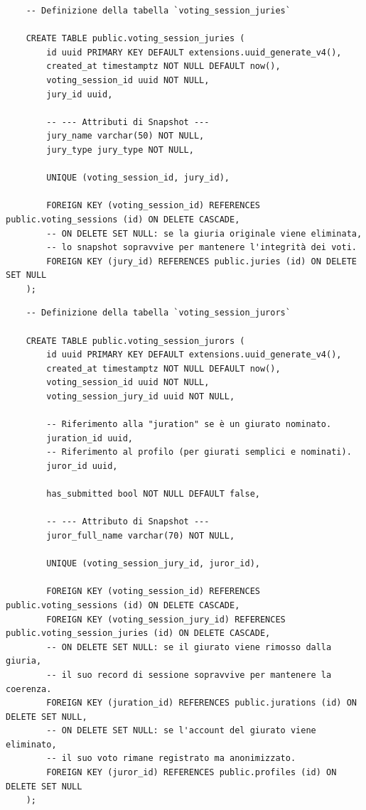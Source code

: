 \begin{longlisting}
    \begin{verbatim}
    -- Definizione della tabella `voting_session_juries`

    CREATE TABLE public.voting_session_juries (
        id uuid PRIMARY KEY DEFAULT extensions.uuid_generate_v4(),
        created_at timestamptz NOT NULL DEFAULT now(),
        voting_session_id uuid NOT NULL,
        jury_id uuid,

        -- --- Attributi di Snapshot ---
        jury_name varchar(50) NOT NULL,
        jury_type jury_type NOT NULL,

        UNIQUE (voting_session_id, jury_id),

        FOREIGN KEY (voting_session_id) REFERENCES public.voting_sessions (id) ON DELETE CASCADE,
        -- ON DELETE SET NULL: se la giuria originale viene eliminata,
        -- lo snapshot sopravvive per mantenere l'integrità dei voti.
        FOREIGN KEY (jury_id) REFERENCES public.juries (id) ON DELETE SET NULL
    );
    \end{verbatim}
    \caption{Definizione della tabella ``voting\_session\_juries'' per lo snapshot dei dati delle giurie.}
    \label{lst:snapshot_juries}
\end{longlisting}

\begin{longlisting}
    \begin{verbatim}
    -- Definizione della tabella `voting_session_jurors`

    CREATE TABLE public.voting_session_jurors (
        id uuid PRIMARY KEY DEFAULT extensions.uuid_generate_v4(),
        created_at timestamptz NOT NULL DEFAULT now(),
        voting_session_id uuid NOT NULL,
        voting_session_jury_id uuid NOT NULL,

        -- Riferimento alla "juration" se è un giurato nominato.
        juration_id uuid,
        -- Riferimento al profilo (per giurati semplici e nominati).
        juror_id uuid,

        has_submitted bool NOT NULL DEFAULT false,

        -- --- Attributo di Snapshot ---
        juror_full_name varchar(70) NOT NULL,

        UNIQUE (voting_session_jury_id, juror_id),

        FOREIGN KEY (voting_session_id) REFERENCES public.voting_sessions (id) ON DELETE CASCADE,
        FOREIGN KEY (voting_session_jury_id) REFERENCES public.voting_session_juries (id) ON DELETE CASCADE,
        -- ON DELETE SET NULL: se il giurato viene rimosso dalla giuria,
        -- il suo record di sessione sopravvive per mantenere la coerenza.
        FOREIGN KEY (juration_id) REFERENCES public.jurations (id) ON DELETE SET NULL,
        -- ON DELETE SET NULL: se l'account del giurato viene eliminato,
        -- il suo voto rimane registrato ma anonimizzato.
        FOREIGN KEY (juror_id) REFERENCES public.profiles (id) ON DELETE SET NULL
    );
    \end{verbatim}
    \caption{Definizione della tabella ``voting\_session\_jurors'' per lo snapshot dei dati dei giurati.}
    \label{lst:snapshot_jurors}
\end{longlisting}

